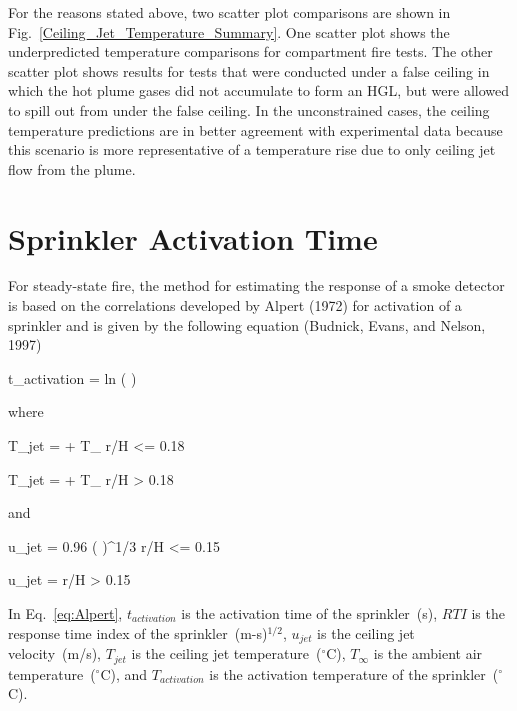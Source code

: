 For the reasons stated above, two scatter plot comparisons are shown in Fig.~\ref{Ceiling_Jet_Temperature_Summary}. One scatter plot shows the underpredicted temperature comparisons for compartment fire tests. The other scatter plot shows results for tests that were conducted under a false ceiling in which the hot plume gases did not accumulate to form an HGL, but were allowed to spill out from under the false ceiling. In the unconstrained cases, the ceiling temperature predictions are in better agreement with experimental data because this scenario is more representative of a temperature rise due to only ceiling jet flow from the plume.

\clearpage


\section{Sprinkler Activation Time}

For steady-state fire, the method for estimating the response of a smoke detector is based on the correlations developed by Alpert (1972) for activation of a sprinkler and is given by the following equation (Budnick, Evans, and Nelson, 1997)

\be
t_{activation} =   ln \left(  \right)\label{eq:Alpert}
\ee

\noindent where

\be
T_{jet} =  + T_\infty {} r/H <= 0.18
\label{eq:Alpert_Tjet_lt}
\ee

\be
T_{jet} =  + T_\infty {} r/H > 0.18
\label{eq:Alpert_Tjet_gt}
\ee

\noindent and

\be
u_{jet} = 0.96 \left(  \right)^{1/3}  r/H <= 0.15
\label{eq:Alpert_ujet_lt}
\ee

\be
u_{jet} =   r/H > 0.15
\label{eq:Alpert_ujet_gt}
\ee

In Eq.~\ref{eq:Alpert}, $t_{activation}$ is the activation time of the sprinkler~(s), $RTI$ is the response time index of the sprinkler~(m-s)$^{1/2}$, $u_{jet}$ is the ceiling jet velocity~(m/s), $T_{jet}$ is the ceiling jet temperature~($^\circ$C), $T_\infty$ is the ambient air temperature~($^\circ$C), and $T_{activation}$ is the activation temperature of the sprinkler~($^\circ$C).

